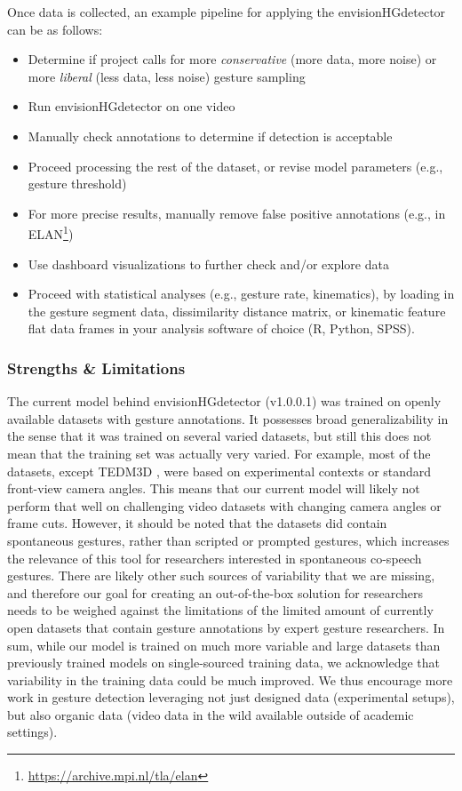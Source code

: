 \documentclass[11pt,headings=small,cleardoublepage=empty,tocflat,numbers=noenddot,twoside,captions=tableheading]{scrbook}
\begin{document}
\begin{refsection}
\begin{table}[H]
\begin{table}[H]
\begin{table}[H]
\begin{table}[H]
Once data is collected, an example pipeline for applying the envisionHGdetector can be as follows:
\begin{itemize}
\item Determine if project calls for more \textit{conservative} (more data, more noise) or more \textit{liberal} (less data, less noise) gesture sampling
\item Run envisionHGdetector on one video
\item Manually check annotations to determine if detection is acceptable
\item Proceed processing the rest of the dataset, or revise model parameters (e.g., gesture threshold)
\item For more precise results, manually remove false positive annotations (e.g., in ELAN\footnote{\url{https://archive.mpi.nl/tla/elan}})
\item Use dashboard visualizations to further check and/or explore data 
\item Proceed with statistical analyses (e.g., gesture rate, kinematics), by loading in the gesture segment data, dissimilarity distance matrix, or kinematic feature flat data frames in your analysis software of choice (R, Python, SPSS).
\end{itemize}

\subsubsection{Strengths \& Limitations}
The current model behind envisionHGdetector (v1.0.0.1) was trained on openly available datasets with gesture annotations. It possesses broad generalizability in the sense that it was trained on several varied datasets, but still this does not mean that the training set was actually very varied. For example, most of the datasets, except TEDM3D \parencite{rohrerTemporalPragmaticAnalysis2022}, were based on experimental contexts or standard front-view camera angles. This means that our current model will likely not perform that well on challenging video datasets with changing camera angles or frame cuts. However, it should be noted that the datasets did contain spontaneous gestures, rather than scripted or prompted gestures, which increases the relevance of this tool for researchers interested in spontaneous co-speech gestures. There are likely other such sources of variability that we are missing, and therefore our goal for creating an out-of-the-box solution for researchers needs to be weighed against the limitations of the limited amount of currently open datasets that contain gesture annotations by expert gesture researchers. In sum, while our model is trained on much more variable and large datasets than previously trained models on single-sourced training data, we  acknowledge that variability in the training data could be much improved. We thus encourage more work in gesture detection leveraging not just designed data (experimental setups), but also organic data (video data in the wild available outside of academic settings).


\end{table}
\end{table}
\end{table}
\end{table}
\end{refsection}
\end{document}
